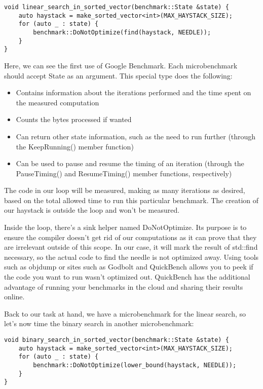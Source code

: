 \begin{lstlisting}[style=styleCXX]
void linear_search_in_sorted_vector(benchmark::State &state) {
	auto haystack = make_sorted_vector<int>(MAX_HAYSTACK_SIZE);
	for (auto _ : state) {
		benchmark::DoNotOptimize(find(haystack, NEEDLE));
	}
}
\end{lstlisting}

Here, we can see the first use of Google Benchmark. Each microbenchmark should accept State as an argument. This special type does the following:

\begin{itemize}
\item 
Contains information about the iterations performed and the time spent on the measured computation

\item 
Counts the bytes processed if wanted 

\item 
Can return other state information, such as the need to run further (through the KeepRunning() member function)

\item 
Can be used to pause and resume the timing of an iteration (through the PauseTiming() and ResumeTiming() member functions, respectively)
\end{itemize}

The code in our loop will be measured, making as many iterations as desired, based on the total allowed time to run this particular benchmark. The creation of our haystack is outside the loop and won't be measured. 

Inside the loop, there's a sink helper named DoNotOptimize. Its purpose is to ensure the compiler doesn't get rid of our computations as it can prove that they are irrelevant outside of this scope. In our case, it will mark the result of std::find necessary, so the actual code to find the needle is not optimized away. Using tools such as objdump or sites such as Godbolt and QuickBench allows you to peek if the code you want to run wasn't optimized out. QuickBench has the additional advantage of running your benchmarks in the cloud and sharing their results online.

Back to our task at hand, we have a microbenchmark for the linear search, so let's now time the binary search in another microbenchmark:

\begin{lstlisting}[style=styleCXX]
void binary_search_in_sorted_vector(benchmark::State &state) {
	auto haystack = make_sorted_vector<int>(MAX_HAYSTACK_SIZE);
	for (auto _ : state) {
		benchmark::DoNotOptimize(lower_bound(haystack, NEEDLE));
	}
}
\end{lstlisting}

